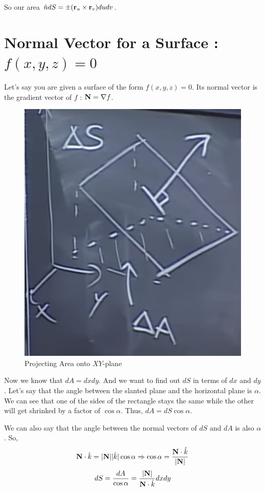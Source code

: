 So our area $\hat{n}dS = \pm ({\bf r}_u \times {\bf r}_v) du dv$.


\section{Normal Vector for a Surface : $f(x, y, z) = 0$ }

Let's say you are given a surface of the form $f(x, y, z) = 0$.
Its normal vector is the gradient vector of $f$ : ${\bf N} = \nabla f$.

\begin{figure}[ht!]
    \centering
    \includegraphics[scale=0.5]{./images/lecture_24_figure_1.png}
    \caption{Projecting Area onto $XY$-plane}
\end{figure}

Now we know that $dA = dx dy$. And we want to find out $dS$ in terms of $dx$ and $dy$.
Let's say that the angle between the slanted plane and the horizontal plane is $\alpha$.
We can see that one of the sides of the rectangle stays the same while the other will get shrinked by a factor of $\cos \alpha$.
Thus, $dA = dS \cos \alpha$.

We can also say that the angle between the normal vectors of $dS$ and $dA$ is also $\alpha$.
So,
$$ 
{\bf N} \cdot \hat{k} = |{\bf N}| |\hat{k}| \cos \alpha 
\Rightarrow \cos \alpha = \frac{ {\bf N} \cdot \hat{k} }{|{\bf N}|}
$$
$$
dS = \frac{dA}{\cos \alpha} = \frac{|{\bf N}|}{{\bf N} \cdot \hat{k}} dx dy 
$$

